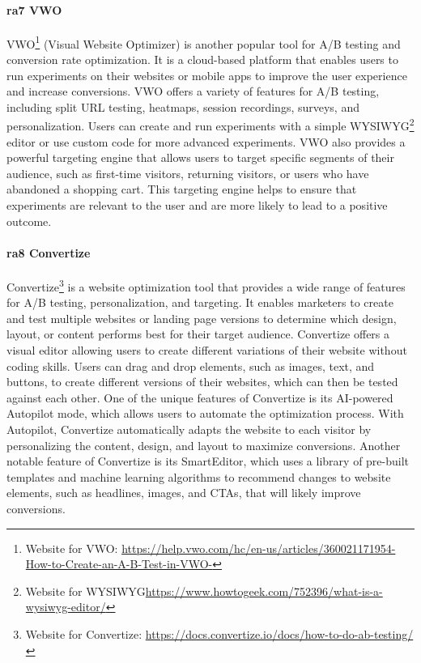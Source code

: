 \paragraph{\ac{ra}7 VWO}
VWO\footnote{Website for VWO: \url{https://help.vwo.com/hc/en-us/articles/360021171954-How-to-Create-an-A-B-Test-in-VWO-}} (Visual Website Optimizer) is another popular tool for A/B testing and conversion rate optimization. 
It is a cloud-based platform that enables users to run experiments on their websites or mobile apps to improve the user experience and increase conversions.
VWO offers a variety of features for A/B testing, including split URL testing, heatmaps, session recordings, surveys, and personalization. 
Users can create and run experiments with a simple WYSIWYG\footnote{Website for WYSIWYG\url{https://www.howtogeek.com/752396/what-is-a-wysiwyg-editor/}} editor or use custom code for more advanced experiments.
VWO also provides a powerful targeting engine that allows users to target specific segments of their audience, such as first-time visitors, returning visitors, or users who have abandoned a shopping cart. 
This targeting engine helps to ensure that experiments are relevant to the user and are more likely to lead to a positive outcome.

\paragraph{\ac{ra}8 Convertize}
Convertize\footnote{Website for Convertize: \url{https://docs.convertize.io/docs/how-to-do-ab-testing/}} is a website optimization tool that provides a wide range of features for A/B testing, personalization, and targeting. 
It enables marketers to create and test multiple websites or landing page versions to determine which design, layout, or content performs best for their target audience.
Convertize offers a visual editor allowing users to create different variations of their website without coding skills. 
Users can drag and drop elements, such as images, text, and buttons, to create different versions of their websites, which can then be tested against each other.
One of the unique features of Convertize is its AI-powered Autopilot mode, which allows users to automate the optimization process. With Autopilot, Convertize automatically adapts the website to each visitor by personalizing the content, design, and layout to maximize conversions.
Another notable feature of Convertize is its SmartEditor, which uses a library of pre-built templates and machine learning algorithms to recommend changes to website elements, such as headlines, images, and CTAs, that will likely improve conversions.

